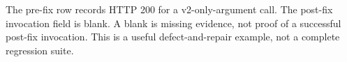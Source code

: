 The pre-fix row records HTTP 200 for a v2-only-argument call. The post-fix invocation field is blank. A blank is missing evidence, not proof of a successful post-fix invocation. This is a useful defect-and-repair example, not a complete regression suite.

